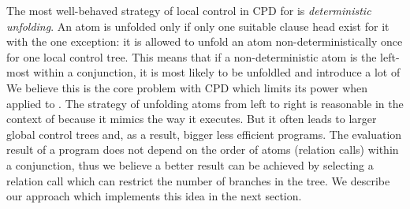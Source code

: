 The most well-behaved strategy of local control in CPD for \pro{} is \emph{deterministic unfolding}.
An atom is unfolded only if only one suitable clause head exist for it with the one exception: it is allowed to unfold an atom non-deterministically once for one local control tree.
This means that if a non-deterministic atom is the left-most within a conjunction, it is most likely to be unfoldled and introduce a lot of
We believe this is the core problem with CPD which limits its power when applied to \mk{}.
The strategy of unfolding atoms from left to right is reasonable in the context of \pro{} because it mimics the way it executes.
But it often leads to larger global control trees and, as a result, bigger less efficient programs.
The evaluation result of a \mk{} program does not depend on the order of atoms (relation calls) within a conjunction, thus we believe a better result can be achieved by selecting a relation call which can restrict the number of branches in the tree.
We describe our approach which implements this idea in the next section.
